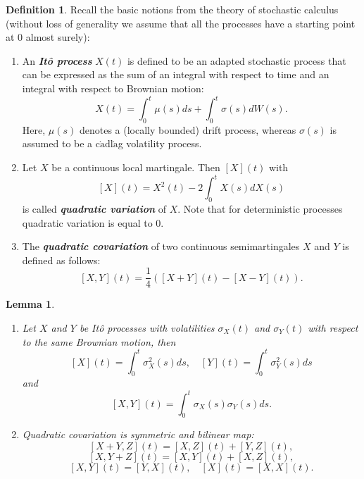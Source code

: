 \documentclass[a4paper,11pt]{book}
\theoremstyle{plain}
\newtheorem{lmm}[thm]{Lemma}
\theoremstyle{definition}
\newtheorem{defn}[thm]{Definition}
\newcommand{\define}[1]{\textit{\textbf{#1}}}
\begin{document}
	\begin{defn} \label{stoch calc notions}
		Recall the basic notions from the theory of stochastic calculus (without loss of generality we assume that all the processes have a starting point at $0$ almost surely):
		\begin{enumerate}
			\item An \define{Itô process} $X(t)$ is defined to be an adapted stochastic process that can be expressed as the sum of an integral with respect to time and an integral with respect to Brownian motion:
			\[ X(t) = \int_{0}^{t} \mu(s) ds + \int_{0}^{t} \sigma(s) dW(s). \]
			Here, $\mu(s)$ denotes a (locally bounded) drift process, whereas $\sigma(s)$ is assumed to be a c$\grave{\text{a}}$dl$\grave{\text{a}}$g volatility process.
			\item Let $X$ be a continuous local martingale. Then $[X](t)$ with
			\[ [X](t) = X^2(t) - 2 \int_0^t X(s)dX(s) \]
			is called \define{quadratic variation} of $X$. Note that for deterministic processes quadratic variation is equal to $0$.
			\item The \define{quadratic covariation} of two continuous semimartingales $X$ and $Y$ is defined as follows:
			\[ [X, Y](t) = \frac{1}{4}([X + Y](t) - [X-Y](t)). \]
		\end{enumerate}
	\end{defn}
	
	\begin{lmm} \label{stoch calc notions2} \
		\begin{enumerate}
			\item Let $X$ and $Y$ be Itô processes with volatilities ${\sigma_X}(t)$ and ${\sigma_Y}(t)$ with respect to the same Brownian motion, then
			\[[X](t) = \int_0^t \sigma_X^2(s) ds, \quad [Y](t) = \int_0^t \sigma_Y^2(s) ds \]
			and
			\[ [X, Y](t) = \int_0^t {\sigma_X}(s){\sigma_Y}(s) ds. \]
			\item Quadratic covariation is symmetric and bilinear map:
			\[ [X + Y, Z](t) = [X, Z](t) + [Y, Z](t), \]
			\[ [X, Y + Z](t) = [X, Y](t) + [X, Z](t), \]
			\[ [X, Y](t) = [Y, X](t), \quad [X](t) = [X, X](t). \]
	    \end{enumerate}
	\end{lmm}
	
\end{document}
